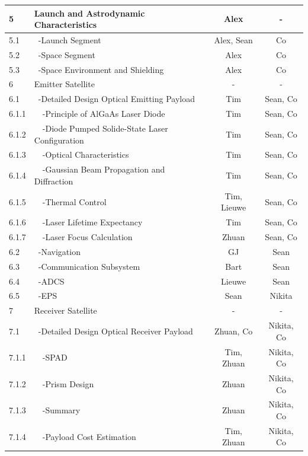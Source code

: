 \begin{center}
\begin{longtable}{|l|l|c|c|}
 5       & Launch and Astrodynamic Characteristics & Alex & -\\\hline
 5.1     & \ -Launch Segment                    & Alex, Sean & Co \\\hline
 5.2     & \ -Space Segment                     & Alex & Co \\\hline
 5.3     & \ -Space Environment and Shielding   & Alex & Co \\\hline\hline
 6       & Emitter Satellite                    & - & -\\\hline
 6.1     & \ -Detailed Design Optical Emitting Payload & Tim & Sean, Co \\\hline
 6.1.1   & \ \ -Principle of AlGaAs Laser Diode & Tim & Sean, Co \\\hline
 6.1.2   & \ \ -Diode Pumped Solide-State Laser Configuration & Tim & Sean, Co \\\hline
 6.1.3   & \ \ -Optical Characteristics        & Tim & Sean, Co\\\hline
 6.1.4   & \ \ -Gaussian Beam Propagation and Diffraction & Tim &  Sean, Co\\\hline  
 6.1.5   & \ \ -Thermal Control                & Tim, Lieuwe & Sean, Co\\\hline
 6.1.6   & \ \ -Laser Lifetime Expectancy     & Tim & Sean, Co\\\hline
 6.1.7   & \ \ -Laser Focus Calculation        & Zhuan & Sean, Co\\\hline
 6.2     & \ -Navigation                        & GJ & Sean \\\hline
 6.3     & \ -Communication Subsystem           & Bart & Sean\\\hline
 6.4     & \ -ADCS                              & Lieuwe & Sean\\\hline
 6.5     & \ -EPS                               & Sean & Nikita\\\hline\hline
 7       & Receiver Satellite                   & - & - \\\hline
 7.1     & \ -Detailed Design Optical Receiver Payload & Zhuan, Co & Nikita, Co\\\hline
 7.1.1   & \ \ -SPAD                           & Tim, Zhuan & Nikita, Co\\\hline
 7.1.2   & \ \ -Prism Design                   & Zhuan & Nikita, Co\\\hline
 7.1.3   & \ \ -Summary                        & Zhuan & Nikita, Co\\\hline
 7.1.4   & \ \ -Payload Cost Estimation        & Tim, Zhuan & Nikita, Co\\\hline

\end{longtable}
\end{center}

